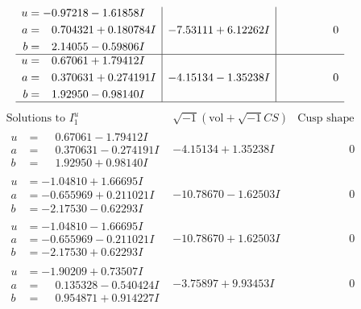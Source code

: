 \documentclass[1p]{elsarticle_modified}
\theoremstyle{definition}
\newcommand{\I}{\sqrt{-1}}
\begin{document}
$$\begin{array}{c|c|c}
\begin{aligned}
u &= -0.97218 - 1.61858 I \\
a &= \phantom{-}0.704321 + 0.180784 I \\
b &= \phantom{-}2.14055 - 0.59806 I\end{aligned}
 & -7.53111 + 6.12262 I & \phantom{-0.000000 } 0 \\ \hline\begin{aligned}
u &= \phantom{-}0.67061 + 1.79412 I \\
a &= \phantom{-}0.370631 + 0.274191 I \\
b &= \phantom{-}1.92950 - 0.98140 I\end{aligned}
 & -4.15134 - 1.35238 I & \phantom{-0.000000 } 0\\
 \hline 
 \end{array}$$\newpage$$\begin{array}{c|c|c}  
\text{Solutions to }I^u_{1}& \I (\text{vol} + \sqrt{-1}CS) & \text{Cusp shape}\\
 \hline 
\begin{aligned}
u &= \phantom{-}0.67061 - 1.79412 I \\
a &= \phantom{-}0.370631 - 0.274191 I \\
b &= \phantom{-}1.92950 + 0.98140 I\end{aligned}
 & -4.15134 + 1.35238 I & \phantom{-0.000000 } 0 \\ \hline\begin{aligned}
u &= -1.04810 + 1.66695 I \\
a &= -0.655969 + 0.211021 I \\
b &= -2.17530 - 0.62293 I\end{aligned}
 & -10.78670 - 1.62503 I & \phantom{-0.000000 } 0 \\ \hline\begin{aligned}
u &= -1.04810 - 1.66695 I \\
a &= -0.655969 - 0.211021 I \\
b &= -2.17530 + 0.62293 I\end{aligned}
 & -10.78670 + 1.62503 I & \phantom{-0.000000 } 0 \\ \hline\begin{aligned}
u &= -1.90209 + 0.73507 I \\
a &= \phantom{-}0.135328 - 0.540424 I \\
b &= \phantom{-}0.954871 + 0.914227 I\end{aligned}
 & -3.75897 + 9.93453 I & \phantom{-0.000000 } 0 \\ \hline\begin{aligned}

\end{aligned}
\end{array}$$
\end{document}
